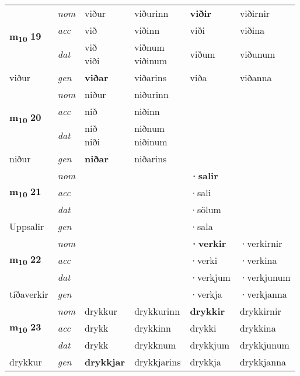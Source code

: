 \begin{longtable}[l]{X>{\footnotesize\itshape}XXXXX}
\multirow{3}{*}{{{\textbf{m{\textsubscript{10}}} \Large{\textbf{19}}}}}  
 & nom & viður & viðurinn    & \textbf{viðir} & viðirnir  \\*
 & acc & við  & viðinn   & viði  & viðina \\*
 & dat & \specialcell{við\\ viði} & \specialcell{viðnum\\ viðinum}   & viðum & viðunum \\*
 {\footnotesize{viður}} &  gen & \textbf{viðar}  & viðarins  & viða & viðanna \\
\cmidrule{1-6}


\multirow{3}{*}{{{\textbf{m{\textsubscript{10}}} \Large{\textbf{20}}}}}  
 & nom & niður & niðurinn    & \textbf{} &   \\*
 & acc & nið  & niðinn   &   &  \\*
 & dat & \specialcell{nið\\ niði} & \specialcell{niðnum\\ niðinum}   &  &  \\*
 {\footnotesize{niður}} &  gen & \textbf{niðar}  & niðarins  &  &  \\
\cmidrule{1-6}


\multirow{3}{*}{{{\textbf{m{\textsubscript{10}}} \Large{\textbf{21}}}}}  
 & nom &  &     & \textbf{·salir} &   \\*
 & acc &   &    & ·sali  &  \\*
 & dat &  &    & ·sölum &  \\*
 {\footnotesize{Uppsalir}} &  gen & \textbf{}  &   & ·sala &  \\
\cmidrule{1-6}


\multirow{3}{*}{{{\textbf{m{\textsubscript{10}}} \Large{\textbf{22}}}}}  
 & nom &  &     & \textbf{·verkir} & ·verkirnir  \\*
 & acc &   &    & ·verki  & ·verkina \\*
 & dat &  &    & ·verkjum & ·verkjunum \\*
 {\footnotesize{tíðaverkir}} &  gen & \textbf{}  &   & ·verkja & ·verkjanna \\
\cmidrule{1-6}


\multirow{3}{*}{{{\textbf{m{\textsubscript{10}}} \Large{\textbf{23}}}}}  
 & nom & drykkur & drykkurinn    & \textbf{drykkir} & drykkirnir  \\*
 & acc & drykk  & drykkinn   & drykki  & drykkina \\*
 & dat & drykk & drykknum   & drykkjum & drykkjunum \\*
 {\footnotesize{drykkur}} &  gen & \textbf{drykkjar}  & drykkjarins  & drykkja & drykkjanna \\
\cmidrule{1-6}



\end{longtable}
